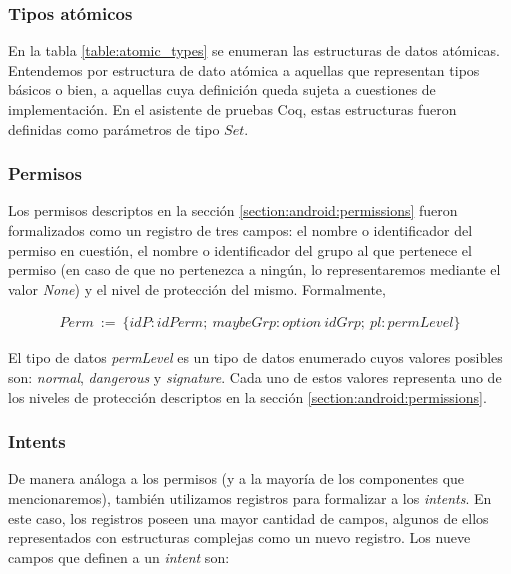 \subsubsection*{Tipos atómicos}
En la tabla \ref{table:atomic_types} se enumeran las estructuras de datos atómicas. Entendemos por
estructura de dato atómica a aquellas que representan tipos básicos o bien, a aquellas cuya
definición queda sujeta a cuestiones de implementación. En el asistente de pruebas Coq, estas
estructuras fueron definidas como parámetros de tipo $Set$.



\subsubsection*{Permisos}
Los permisos descriptos en la sección \ref{section:android:permissions} fueron formalizados como un
registro de tres campos: el nombre o identificador del permiso en cuestión, el nombre o
identificador del grupo al que pertenece el permiso (en caso de que no pertenezca a ningún, lo
representaremos mediante el valor \textit{None}) y el nivel de protección del mismo. Formalmente,

\begin{align*}
    Perm\ :=\ \{ idP: idPerm;\ maybeGrp: option\ idGrp;\ pl: permLevel \}
\end{align*}

El tipo de datos \textit{permLevel} es un tipo de datos enumerado cuyos valores posibles son:
\textit{normal}, \textit{dangerous} y \textit{signature}. Cada uno de estos valores representa uno
de los niveles de protección descriptos en la sección \ref{section:android:permissions}.

\subsubsection*{Intents}
De manera análoga a los permisos (y a la mayoría de los componentes que mencionaremos), también
utilizamos registros para formalizar a los \textit{intents}. En este caso, los registros poseen una
mayor cantidad de campos, algunos de ellos representados con estructuras complejas como un nuevo
registro. Los nueve campos que definen a un \textit{intent} son:

